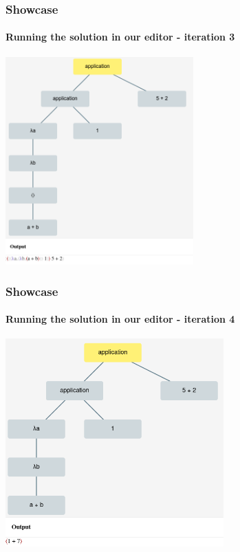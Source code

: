\begin{frame}
    \frametitle{Showcase}
    \framesubtitle{Running the solution in our editor - iteration 3}
    \includegraphics[width=\textwidth, height=8cm]{i3.png}
\end{frame}

\begin{frame}
    \frametitle{Showcase}
    \framesubtitle{Running the solution in our editor - iteration 4}
    \includegraphics[width=\textwidth, height=8cm]{i4.png}
\end{frame}
